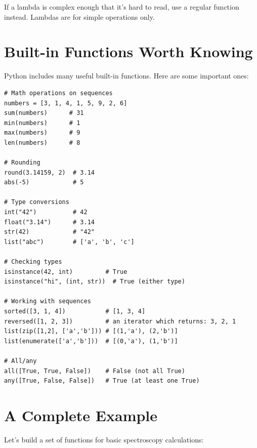 \begin{tip}
If a lambda is complex enough that it's hard to read, use a regular function instead. Lambdas are for simple operations only.
\end{tip}

\section{Built-in Functions Worth Knowing}
\label{sec:builtin-functions}

Python includes many useful built-in functions. Here are some important ones:

\begin{lstlisting}
# Math operations on sequences
numbers = [3, 1, 4, 1, 5, 9, 2, 6]
sum(numbers)      # 31
min(numbers)      # 1
max(numbers)      # 9
len(numbers)      # 8

# Rounding
round(3.14159, 2)  # 3.14
abs(-5)            # 5

# Type conversions
int("42")          # 42
float("3.14")      # 3.14
str(42)            # "42"
list("abc")        # ['a', 'b', 'c']

# Checking types
isinstance(42, int)         # True
isinstance("hi", (int, str))  # True (either type)

# Working with sequences
sorted([3, 1, 4])           # [1, 3, 4]
reversed([1, 2, 3])         # an iterator which returns: 3, 2, 1
list(zip([1,2], ['a','b'])) # [(1,'a'), (2,'b')]
list(enumerate(['a','b']))  # [(0,'a'), (1,'b')]

# All/any
all([True, True, False])    # False (not all True)
any([True, False, False])   # True (at least one True)
\end{lstlisting}

\section{A Complete Example}
\label{sec:function-example}

Let's build a set of functions for basic spectroscopy calculations:

